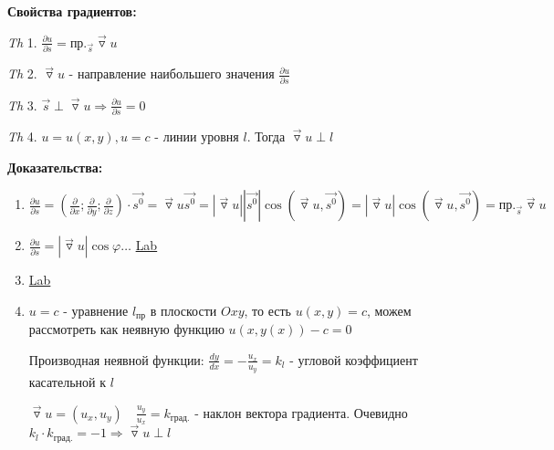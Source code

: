 \documentclass[12pt]{article}
\begin{document}
    \vspace{5mm}
    \textbf{
    Свойства градиентов:}

    \vspace{3mm}
\textit{Th} 1. $\displaystyle \frac{\partial u}{\partial s} = \text{пр.}_{\overrightarrow{s}} \overrightarrow{\triangledown} u$

    \vspace{3mm}
\textit{Th} 2. $\overrightarrow{\triangledown} u$ - направление наибольшего значения $\displaystyle \frac{\partial u}{\partial s}$

    \vspace{3mm}
\textit{Th} 3. $\displaystyle \overrightarrow{s} \perp \overrightarrow{\triangledown} u \Longrightarrow \frac{\partial u}{\partial s} = 0$

    \vspace{3mm}
\textit{Th} 4. $u = u(x, y), u = c$ - линии уровня $l$. Тогда $\overrightarrow{\triangledown} u \perp l$

    \vspace{5mm}
    \textbf{
    Доказательства:}

    \begin{enumerate}
        \item $\displaystyle \frac{\partial u}{\partial s} = (\frac{\partial}{\partial x}; \frac{\partial}{\partial y}; \frac{\partial}{\partial z}) \cdot \overrightarrow{s^0} =
        \overrightarrow{\triangledown} u \overrightarrow{s^0} = |\overrightarrow{\triangledown} u| |\overrightarrow{s^0}| \cos(\overrightarrow{\triangledown} u, \overrightarrow{s^0}) =
        |\overrightarrow{\triangledown} u| \cos(\overrightarrow{\triangledown} u, \overrightarrow{s^0}) = \text{пр.}_{\overrightarrow{s}} \overrightarrow{\triangledown} u$

        \item $\displaystyle \frac{\partial u}{\partial s} = |\overrightarrow{\triangledown} u| \cos\varphi \dots $ \underline{Lab}

        \item \underline{Lab}

        \item $u = c$ - уравнение $l_{\text{пр}}$ в плоскости $Oxy$, то есть $u(x, y) = c$, можем рассмотреть как неявную функцию $u(x, y(x)) - c = 0$

        Производная неявной функции: $\displaystyle \frac{dy}{dx} = -\frac{u_x}{u_y} = k_l$ - угловой коэффициент касательной к $l$

        $\displaystyle \overrightarrow{\triangledown} u = (u_x, u_y) \quad \frac{u_y}{u_x} = k_{\text{град.}}$ - наклон вектора градиента.
        Очевидно $k_l \cdot k_{\text{град.}} = -1 \Longrightarrow \overrightarrow{\triangledown} u \perp l$
    \end{enumerate}
\end{document}
